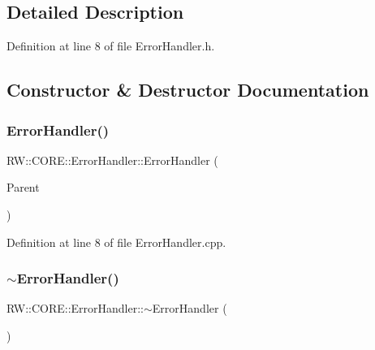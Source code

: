 \subsection{Detailed Description}


Definition at line 8 of file Error\+Handler.\+h.



\subsection{Constructor \& Destructor Documentation}
\hypertarget{class_r_w_1_1_c_o_r_e_1_1_error_handler_a094d83179b751152eb56cecb5548ff47}{}\label{class_r_w_1_1_c_o_r_e_1_1_error_handler_a094d83179b751152eb56cecb5548ff47} 
\subsubsection{\texorpdfstring{Error\+Handler()}{ErrorHandler()}}
{\footnotesize\ttfamily R\+W\+::\+C\+O\+R\+E\+::\+Error\+Handler\+::\+Error\+Handler (\begin{DoxyParamCaption}\item[{Q\+Object $\ast$}]{Parent }\end{DoxyParamCaption})}



Definition at line 8 of file Error\+Handler.\+cpp.

\hypertarget{class_r_w_1_1_c_o_r_e_1_1_error_handler_a600852f08871a018da65f523ace50bc2}{}\label{class_r_w_1_1_c_o_r_e_1_1_error_handler_a600852f08871a018da65f523ace50bc2} 
\subsubsection{\texorpdfstring{$\sim$\+Error\+Handler()}{~ErrorHandler()}}
{\footnotesize\ttfamily R\+W\+::\+C\+O\+R\+E\+::\+Error\+Handler\+::$\sim$\+Error\+Handler (\begin{DoxyParamCaption}{ }\end{DoxyParamCaption})}



